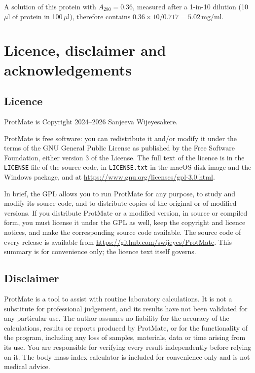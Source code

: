 \documentclass[11pt,a4paper,oneside]{report}
\newcommand{\copyrightyears}{2024--2026}
\newcommand{\repourl}{https://github.com/swijeyes/ProtMate}
\newcommand{\repo}{\url{\repourl}}
\newcommand{\gplgrant}{either version 3 of the License}
\newcommand{\cmd}[1]{\texttt{#1}}            %
\newcommand{\ul}{\ensuremath{\mu}l}
\begin{document}
A solution of this protein with $A_{280} = 0.36$, measured after a 1-in-10 dilution
(10\,\ul{} of protein in 100\,\ul), therefore contains
$0.36\times 10 / 0.717 = 5.02$\,mg/ml.

\chapter{Licence, disclaimer and acknowledgements}\label{app:licence}

\section{Licence}

ProtMate is Copyright \textcopyright{} \copyrightyears{} Sanjeeva Wijeyesakere.

ProtMate is free software: you can redistribute it and/or modify it under the terms of the GNU
General Public License as published by the Free Software Foundation, \gplgrant. The full text of
the licence is in the \cmd{LICENSE} file of the source code, in \cmd{LICENSE.txt} in the macOS
disk image and the Windows package, and at
\url{https://www.gnu.org/licenses/gpl-3.0.html}.

In brief, the GPL allows you to run ProtMate for any purpose, to study and modify its source code,
and to distribute copies of the original or of modified versions. If you distribute ProtMate or a
modified version, in source or compiled form, you must license it under the GPL as well, keep the
copyright and licence notices, and make the corresponding source code available. The source code
of every release is available from \repo. This summary is for convenience only; the licence text
itself governs.

\section{Disclaimer}

ProtMate is a tool to assist with routine laboratory calculations. It is not a substitute for
professional judgement, and its results have not been validated for any particular use. The author
assumes no liability for the accuracy of the calculations, results or reports produced by ProtMate,
or for the functionality of the program, including any loss of samples, materials, data or time
arising from its use. You are responsible for verifying every result independently before relying
on it. The body mass index calculator is included for convenience only and is not medical advice.
\end{document}
